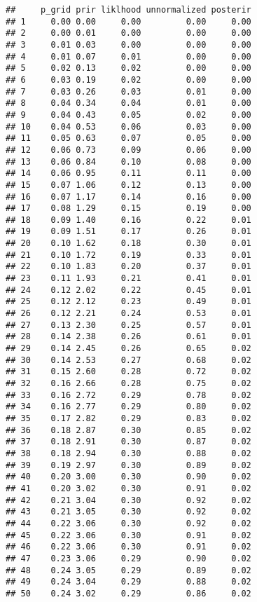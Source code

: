 \documentclass[
]{article}
\begin{document}
\begin{verbatim}
##     p_grid prir liklhood unnormalized posterir
## 1     0.00 0.00     0.00         0.00     0.00
## 2     0.00 0.01     0.00         0.00     0.00
## 3     0.01 0.03     0.00         0.00     0.00
## 4     0.01 0.07     0.01         0.00     0.00
## 5     0.02 0.13     0.02         0.00     0.00
## 6     0.03 0.19     0.02         0.00     0.00
## 7     0.03 0.26     0.03         0.01     0.00
## 8     0.04 0.34     0.04         0.01     0.00
## 9     0.04 0.43     0.05         0.02     0.00
## 10    0.04 0.53     0.06         0.03     0.00
## 11    0.05 0.63     0.07         0.05     0.00
## 12    0.06 0.73     0.09         0.06     0.00
## 13    0.06 0.84     0.10         0.08     0.00
## 14    0.06 0.95     0.11         0.11     0.00
## 15    0.07 1.06     0.12         0.13     0.00
## 16    0.07 1.17     0.14         0.16     0.00
## 17    0.08 1.29     0.15         0.19     0.00
## 18    0.09 1.40     0.16         0.22     0.01
## 19    0.09 1.51     0.17         0.26     0.01
## 20    0.10 1.62     0.18         0.30     0.01
## 21    0.10 1.72     0.19         0.33     0.01
## 22    0.10 1.83     0.20         0.37     0.01
## 23    0.11 1.93     0.21         0.41     0.01
## 24    0.12 2.02     0.22         0.45     0.01
## 25    0.12 2.12     0.23         0.49     0.01
## 26    0.12 2.21     0.24         0.53     0.01
## 27    0.13 2.30     0.25         0.57     0.01
## 28    0.14 2.38     0.26         0.61     0.01
## 29    0.14 2.45     0.26         0.65     0.02
## 30    0.14 2.53     0.27         0.68     0.02
## 31    0.15 2.60     0.28         0.72     0.02
## 32    0.16 2.66     0.28         0.75     0.02
## 33    0.16 2.72     0.29         0.78     0.02
## 34    0.16 2.77     0.29         0.80     0.02
## 35    0.17 2.82     0.29         0.83     0.02
## 36    0.18 2.87     0.30         0.85     0.02
## 37    0.18 2.91     0.30         0.87     0.02
## 38    0.18 2.94     0.30         0.88     0.02
## 39    0.19 2.97     0.30         0.89     0.02
## 40    0.20 3.00     0.30         0.90     0.02
## 41    0.20 3.02     0.30         0.91     0.02
## 42    0.21 3.04     0.30         0.92     0.02
## 43    0.21 3.05     0.30         0.92     0.02
## 44    0.22 3.06     0.30         0.92     0.02
## 45    0.22 3.06     0.30         0.91     0.02
## 46    0.22 3.06     0.30         0.91     0.02
## 47    0.23 3.06     0.29         0.90     0.02
## 48    0.24 3.05     0.29         0.89     0.02
## 49    0.24 3.04     0.29         0.88     0.02
## 50    0.24 3.02     0.29         0.86     0.02

\end{verbatim}
\end{document}
